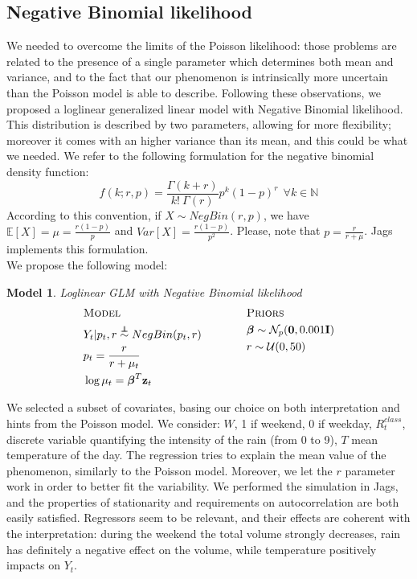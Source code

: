\documentclass[11pt,twoside]{report}
\newcommand\independent{\protect\mathpalette{\protect\independenT}{\perp}}
\def\independenT#1#2{\mathrel{\rlap{$#1#2$}\mkern2mu{#1#2}}}
\newtheorem{model}{Model}
\begin{document}
\subsection{Negative Binomial likelihood}
We needed to overcome the limits of the Poisson likelihood: those problems are related to the presence of a single parameter which determines both mean and variance, and to the fact that our phenomenon is intrinsically more uncertain than the Poisson model is able to describe. Following these observations, we proposed a loglinear generalized linear model with Negative Binomial likelihood. This distribution is described by two parameters, allowing for more flexibility; moreover it comes with an higher variance than its mean, and this could be what we needed.
We refer to the following formulation for the negative binomial density function:
\begin{equation}
f(k;r,p) = \frac{\Gamma(k+r)}{k!\ \Gamma(r)} p^k (1-p)^r \ \ \forall k\in\mathbb{N}
\end{equation}
According to this convention, if $X \sim NegBin(r,p)$, we have $\mathbb{E}[X] = \mu = \frac{r(1-p)}{p}$ and $Var[X] = \frac{r(1-p)}{p^2}$. Please, note that $p = \frac{r}{r+\mu}$. Jags implements this formulation.\\
We propose the following model: 
\newpage
\begin{model} Loglinear GLM with Negative Binomial likelihood\\
	\begin{equation*}
	\begin{aligned}
	&\textsc{Model}\\
	&Y_t  |  p_t,r \overset{\independent}{\sim} NegBin(p_t,r)\\
	&p_t = \frac{r}{r+\mu_t}\\
	&\log{\mu_t} = \boldsymbol{\beta}^T\mathbf{z}_t\\
	\end{aligned}
	\qquad \qquad
	\begin{aligned}[c]
	&\textsc{Priors}\\
	&\boldsymbol{\beta} \sim \mathcal{N}_p(\mathbf{0}, 0.001\mathbf{I})\\
	&r \sim \mathcal{U}(0,50)\\
	&\\
	&\\
	\end{aligned}
	\end{equation*}
\end{model}
We selected a subset of covariates, basing our choice on both interpretation and hints from the Poisson model. We consider: $W$, 1 if weekend, 0 if weekday, $R_{t}^{class}$, discrete variable quantifying the intensity of the rain (from 0 to 9), $T$ mean temperature of the day. The regression tries to explain the mean value of the phenomenon, similarly to the Poisson model. Moreover, we let the $r$ parameter work in order to better fit the variability. We performed the simulation in Jags, and the properties of stationarity and requirements on autocorrelation are both easily satisfied. Regressors seem to be relevant, and their effects are coherent with the interpretation: during the weekend the total volume strongly decreases, rain has definitely a negative effect on the volume, while temperature positively impacts on $Y_t$.
\end{document}
